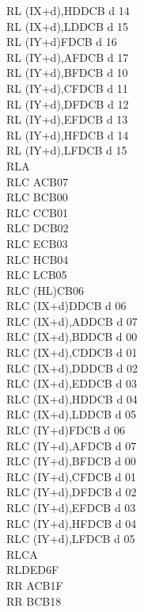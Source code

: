 \begin{multicols}{3}
{\begin{tabbing}
		RL (IX+d),H\UNDOC\>DDCB d 14\\
		RL (IX+d),L\UNDOC\>DDCB d 15\\
		RL (IY+d)\>FDCB d 16\\
		RL (IY+d),A\UNDOC\>FDCB d 17\\
		RL (IY+d),B\UNDOC\>FDCB d 10\\
		RL (IY+d),C\UNDOC\>FDCB d 11\\
		RL (IY+d),D\UNDOC\>FDCB d 12\\
		RL (IY+d),E\UNDOC\>FDCB d 13\\
		RL (IY+d),H\UNDOC\>FDCB d 14\\
		RL (IY+d),L\UNDOC\>FDCB d 15\\
		RLA\\
		RLC A\>CB07\\
		RLC B\>CB00\\
		RLC C\>CB01\\
		RLC D\>CB02\\
		RLC E\>CB03\\
		RLC H\>CB04\\
		RLC L\>CB05\\
		RLC (HL)\>CB06\\
		RLC (IX+d)\>DDCB d 06\\
		RLC (IX+d),A\UNDOC\>DDCB d 07\\
		RLC (IX+d),B\UNDOC\>DDCB d 00\\
		RLC (IX+d),C\UNDOC\>DDCB d 01\\
		RLC (IX+d),D\UNDOC\>DDCB d 02\\
		RLC (IX+d),E\UNDOC\>DDCB d 03\\
		RLC (IX+d),H\UNDOC\>DDCB d 04\\
		RLC (IX+d),L\UNDOC\>DDCB d 05\\
		RLC (IY+d)\>FDCB d 06\\
		RLC (IY+d),A\UNDOC\>FDCB d 07\\
		RLC (IY+d),B\UNDOC\>FDCB d 00\\
		RLC (IY+d),C\UNDOC\>FDCB d 01\\
		RLC (IY+d),D\UNDOC\>FDCB d 02\\
		RLC (IY+d),E\UNDOC\>FDCB d 03\\
		RLC (IY+d),H\UNDOC\>FDCB d 04\\
		RLC (IY+d),L\UNDOC\>FDCB d 05\\
		RLCA\\
		RLD\>ED6F\\
		RR A\>CB1F\\
		RR B\>CB18\\

\end{tabbing}}
\end{multicols}
